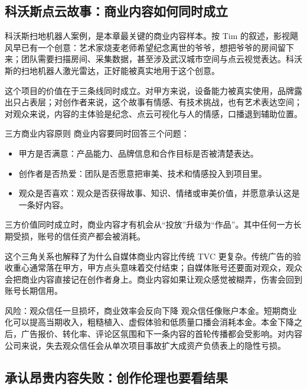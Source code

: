 \documentclass[a4paper]{article}
\begin{document}
\subsection{科沃斯点云故事：商业内容如何同时成立}

科沃斯扫地机器人案例，是本章最关键的商业内容样本。按 Tim 的叙述，影视飓风早已有一个创意：艺术家烧麦老师希望纪念离世的爷爷，想把爷爷的房间留下来；团队需要扫描房间、采集数据，甚至涉及武汉城市空间与点云视觉表达。科沃斯的扫地机器人激光雷达，正好能被真实地用于这个创意。

这个项目的价值在于三条线同时成立。对甲方来说，设备能力被真实使用，品牌露出只占表层；对创作者来说，这个故事有情感、有技术挑战，也有艺术表达空间；对观众来说，内容的主体验是纪念、点云可视化与人的情感，口播退到辅助位置。

\begin{importantbox}{三方商业内容原则}
商业内容要同时回答三个问题：

\begin{itemize}
  \item 甲方是否满意：产品能力、品牌信息和合作目标是否被清楚表达。
  \item 创作者是否热爱：团队是否愿意把审美、技术和情感投入到项目里。
  \item 观众是否喜欢：观众是否获得故事、知识、情绪或审美价值，并愿意承认这是一条好内容。
\end{itemize}

三方价值同时成立时，商业内容才有机会从“投放”升级为“作品”。其中任何一方长期受损，账号的信任资产都会被消耗。
\end{importantbox}

这个三角关系也解释了为什么自媒体商业内容比传统 TVC 更复杂。传统广告的验收重心通常落在甲方，甲方点头意味着交付结束；自媒体账号还要面对观众，观众会把商业内容直接记在创作者身上。商业内容如果让观众感觉被糊弄，伤害会回到账号长期信用。

\begin{warningbox}{风险：观众信任一旦损坏，商业效率会反向下降}
观众信任像账户本金。短期商业化可以提高当期收入，粗糙植入、虚假体验和低质量口播会消耗本金。本金下降之后，广告报价、转化率、评论区氛围和下一条内容的首轮传播都会受影响。对内容公司来说，失去观众信任会从单次项目事故扩大成资产负债表上的隐性亏损。
\end{warningbox}

\subsection{承认昂贵内容失败：创作伦理也要看结果}
\end{document}
